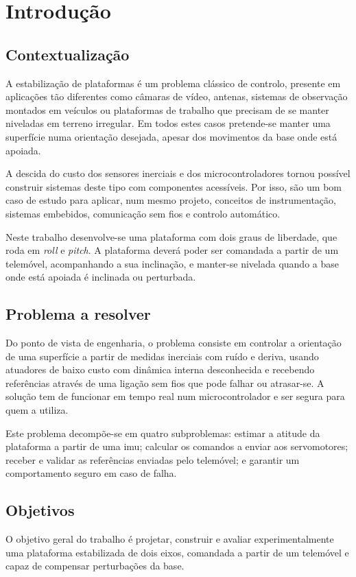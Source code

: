 \chapter{Introdução}
\label{ch:introducao}

\section{Contextualização}
A estabilização de plataformas é um problema clássico de controlo, presente em aplicações tão diferentes como câmaras de vídeo, antenas, sistemas de observação montados em veículos ou plataformas de trabalho que precisam de se manter niveladas em terreno irregular. Em todos estes casos pretende-se manter uma superfície numa orientação desejada, apesar dos movimentos da base onde está apoiada.

A descida do custo dos sensores inerciais e dos microcontroladores tornou possível construir sistemas deste tipo com componentes acessíveis. Por isso, são um bom caso de estudo para aplicar, num mesmo projeto, conceitos de instrumentação, sistemas embebidos, comunicação sem fios e controlo automático.

Neste trabalho desenvolve-se uma plataforma com dois graus de liberdade, que roda em \textit{roll} e \textit{pitch}. A plataforma deverá poder ser comandada a partir de um telemóvel, acompanhando a sua inclinação, e manter-se nivelada quando a base onde está apoiada é inclinada ou perturbada.

\section{Problema a resolver}
Do ponto de vista de engenharia, o problema consiste em controlar a orientação de uma superfície a partir de medidas inerciais com ruído e deriva, usando atuadores de baixo custo com dinâmica interna desconhecida e recebendo referências através de uma ligação sem fios que pode falhar ou atrasar-se. A solução tem de funcionar em tempo real num microcontrolador e ser segura para quem a utiliza.

Este problema decompõe-se em quatro subproblemas: estimar a atitude da plataforma a partir de uma \gls{imu}; calcular os comandos a enviar aos servomotores; receber e validar as referências enviadas pelo telemóvel; e garantir um comportamento seguro em caso de falha.

\section{Objetivos}
O objetivo geral do trabalho é projetar, construir e avaliar experimentalmente uma plataforma estabilizada de dois eixos, comandada a partir de um telemóvel e capaz de compensar perturbações da base.

